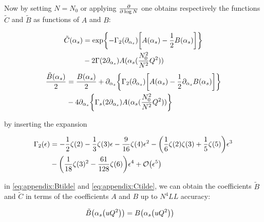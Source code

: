 \documentclass[../main.tex]{subfiles}
\begin{document}
Now by setting $N=N_0$ or applying $\pdv{\log N}$ one obtains respectively the functions $\tilde{C}$ and  $\tilde{B}$ as functions of $A$ and $B$:

\begin{equation}\label{eq:appendix:Ctilde}
    \begin{split}
    \tilde{C}(\alpha_s) &= \exp{-\Gamma_2(\partial_{\alpha_s}) \qty[A(\alpha_s)-\frac{1}{2} B(\alpha_s)]}\\
    &- 2 \Gamma\qty(2\partial_{\alpha_s}) A(\alpha_s(\frac{N_0^2}{N^2}Q^2)) 
    \end{split}
\end{equation}
\begin{equation}\label{eq:appendix:Btilde}
    \begin{split}
    \frac{\tilde{B}(\alpha_s)}{2} &= \frac{B(\alpha_s)}{2} + \partial_{\alpha_s} \qty{\Gamma_2(\partial_{\alpha_s}) \qty[A(\alpha_s)-\frac{1}{2} \partial_{\alpha_s}B(\alpha_s)]} \\
    &- 4 \partial_{\alpha_s} \qty{\Gamma_s\qty(2\partial_{\alpha_s}) A(\alpha_s(\frac{N_0^2}{N^2}Q^2))} 
\end{split}
\end{equation}

by inserting the expansion 

\begin{align}
    \begin{split}
    \Gamma_2(\epsilon) &= -\frac{1}{2}\zeta(2) -\frac{1}{3}\zeta(3) \epsilon - \frac{9}{16}\zeta(4) \epsilon^2 - \qty(\frac{1}{6}\zeta(2)\zeta(3)+ \frac{1}{5}\zeta(5))\epsilon^3 \\
    &- \qty(\frac{1}{18}\zeta(3)^2 - \frac{61}{128}\zeta(6))\epsilon^4 + \order{\epsilon^5}   
    \end{split}
\end{align}

in \cref{eq:appendix:Btilde} and \cref{eq:appendix:Ctilde}, we can obtain the coefficients $\tilde{B}$ and $\tilde{C}$ in terms of the coefficients $A$ and $B$ up to $N^4LL$ accuracy: 

\begin{align}
    \begin{split}
    \tilde{B}\qty(\alpha_s \qty(u Q^2)) &= B\qty(\alpha_s \qty(u Q^2))  
    \end{split}
\end{align}
\end{document}
